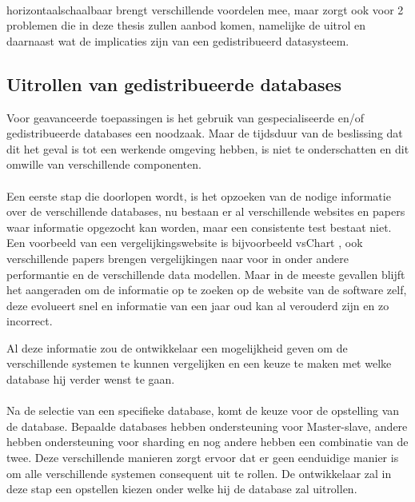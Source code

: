 \paragraph{}
\Gls{horizontaalschaalbaar} brengt verschillende voordelen mee, maar zorgt ook voor 2 problemen die in deze thesis zullen aanbod komen, namelijke de uitrol en daarnaast wat de implicaties zijn van een gedistribueerd datasysteem. 

\subsection{Uitrollen van gedistribueerde databases}
Voor geavanceerde toepassingen is het gebruik van gespecialiseerde en/of gedistribueerde databases een noodzaak. Maar de tijdsduur van de beslissing dat dit het geval is tot een werkende omgeving hebben, is niet te onderschatten en dit omwille van verschillende componenten. 

\paragraph{}Een eerste stap die doorlopen wordt, is het opzoeken van de nodige informatie over de verschillende databases, nu bestaan er al verschillende websites en papers waar informatie opgezocht kan worden, maar een consistente test bestaat niet. Een voorbeeld van een vergelijkingswebsite is bijvoorbeeld vsChart \cite{vsChart}, ook verschillende papers brengen vergelijkingen naar voor in onder andere performantie en de verschillende data modellen. Maar in de meeste gevallen blijft het aangeraden om de informatie op te zoeken op de website van de software zelf, deze evolueert snel en informatie van een jaar oud kan al verouderd zijn en zo incorrect. 

Al deze informatie zou de ontwikkelaar een mogelijkheid geven om de verschillende systemen te kunnen vergelijken en een keuze te maken met welke database hij verder wenst te gaan. 

\paragraph{} Na de selectie van een specifieke database, komt de keuze voor de opstelling van de database. Bepaalde databases hebben ondersteuning voor Master-slave, andere hebben ondersteuning voor sharding en nog andere hebben een combinatie van de twee. Deze verschillende manieren zorgt ervoor dat er geen eenduidige manier is om alle verschillende systemen consequent uit te rollen. De ontwikkelaar zal in deze stap een opstellen kiezen onder welke hij de database zal uitrollen. 

